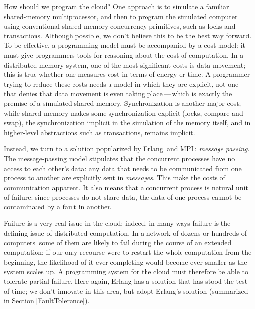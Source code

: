 \documentclass[preprint]{sigplanconf}
\newcommand\spj[1]{\nb{spj}{#1}}
\begin{document}
How should we program the cloud?  One approach is to simulate a familiar shared-memory multiprocessor, and then to program the simulated computer using conventional shared-memory concurrency primitives, such as locks and transactions. 
Although possible, we don't believe this to be the best way forward.
To be effective, a programming model must be accompanied by a cost model: it must give programmers tools for reasoning about the cost of computation.  In a distributed memory system, one of the most significant costs is data movement; this is true whether one measures cost in terms of energy or time.  A programmer trying to reduce these costs needs a model in which they are explicit, not one that denies that data movement is even taking place\,---\,which is exactly the premise of a simulated shared memory. 
Synchronization is another major cost; while shared memory makes some synchronization explicit (locks, compare and swap), the synchronization implicit in the simulation of the memory itself, and in higher-level abstractions such as transactions, remains implicit.

Instead, we turn to a solution popularized by \mbox{Erlang}\,\cite{Erlang93} and MPI\,\cite{mpi99}: {\em message passing}. The message-passing model stipulates that the concurrent processes have no access to each other's data: any data that needs to be communicated from one process to another are explicitly sent in {\em messages}.  This make the costs of communication apparent.
It also means that a concurrent process is natural unit of failure: since processes do not share data, the data of one process cannot be contaminated by a fault in another.

Failure is a very real issue in the cloud; indeed, in many ways failure is the defining issue of distributed computation.  In a network of dozens or hundreds of computers, some of them are likely to fail during the course of an extended computation; if our only recourse were to restart the whole computation from the beginning, the likelihood of it ever completing would become ever smaller as the system scales up.  
A programming system for the cloud must therefore be able to tolerate partial failure.  Here again, Erlang has a solution that has stood the test of time; 
we don't innovate in this area, but adopt Erlang's solution (summarized in Section \ref{FaultTolerance}).
\end{document}
